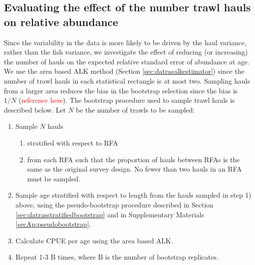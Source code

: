 \documentclass[a4paper 12pt]{article}
\numberwithin{equation}{section}
\newcommand{\ed}[1]{\textcolor{red}{#1}}
\begin{document}
\subsection{Evaluating the effect of the number trawl hauls on relative abundance}
\label{sec:evaluatingtrawlhauls}
Since the variability in the data is more likely to be driven by the haul variance, rather than the fish variance, we investigate the effect of reducing (or increasing) the number of hauls on the expected relative standard error of abundance at age. We use the area based ALK method (Section \ref{sec:datrasalkestimator}) since the number of trawl hauls in each statistical rectangle is at most two. Sampling hauls from a larger area reduces the bias in the bootstrap selection since the bias is $1/N$ (\ed{reference here}). The bootstrap procedure used to sample trawl hauls is described below. Let $N$ be the number of trawls to be sampled:
\begin{enumerate}
\item Sample $N$ hauls
     \begin{enumerate}
      \item stratified with respect to RFA
      \item from each RFA such that the proportion of hauls between RFAs is the same as the original survey design. No fewer than two hauls in an RFA must be sampled.
      \end{enumerate} 
\item Sample age stratified with respect to length from the hauls sampled in step 1) above, using the pseudo-bootstrap procedure described in Section \ref{sec:datrasstratifiedbootstrap} and in Supplementary Materials \ref{secAp:pseudobootstrap}.
\item Calculate CPUE per age using the area based ALK.
\item Repeat 1-3 B times, where B is the number of bootstrap replicates.
\end{enumerate}
\end{document}
